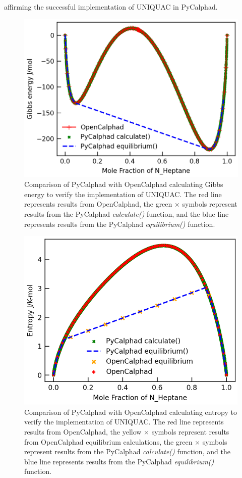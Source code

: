 affirming the successful implementation of UNIQUAC in PyCalphad.

\begin{figure}[H]
    \centering
    \includegraphics[width=0.5\linewidth]{models/Models-UQC-Gibbsenergy.png}
    \caption{Comparison of PyCalphad with OpenCalphad calculating Gibbs energy to verify the implementation of UNIQUAC. The red line represents results from OpenCalphad, the green $\times$ symbols represent results from the PyCalphad \textit{calculate()} function, and the blue line represents results from the PyCalphad \textit{equilibrium()} function.}
    \label{models:fig:UQCGibbsE}
\end{figure}

\begin{figure}[H]
    \centering
    \includegraphics[width=0.5\linewidth]{models/Models-UQC-Entropy.png}
    \caption{Comparison of PyCalphad with OpenCalphad calculating entropy to verify the implementation of UNIQUAC. The red line represents results from OpenCalphad, the yellow $\times$ symbols represent results from OpenCalphad equilibrium calculations, the green $\times$ symbols represent results from the PyCalphad \textit{calculate()} function, and the blue line represents results from the PyCalphad \textit{equilibrium()} function.}
    \label{models:fig:UQCS}
\end{figure}

